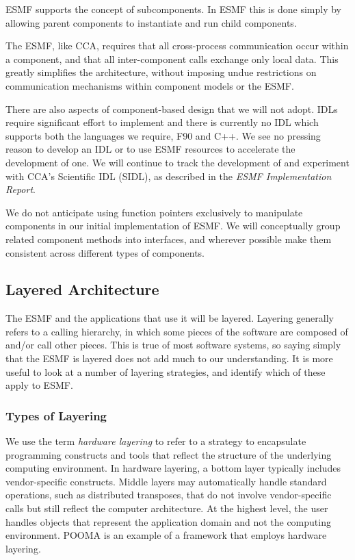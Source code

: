 ESMF supports the concept of subcomponents.  In ESMF this is done simply
by allowing parent components to instantiate and run child components.

The ESMF, like CCA, requires that all cross-process communication occur
within a component, and that all inter-component calls exchange only
local data.  This greatly simplifies the architecture, without 
imposing undue restrictions on communication mechanisms within component
models or the ESMF.

There are also aspects of component-based design that we will not adopt.
IDLs require significant effort to implement and there is currently no
IDL which supports both the languages we require, F90 and C++.  We see 
no pressing
reason to develop an IDL or to use ESMF resources to accelerate the development
of one.  We will continue to track the 
development of and experiment with CCA's Scientific IDL (SIDL), 
as described in the {\it ESMF Implementation Report}.

We do not anticipate using function pointers exclusively to manipulate
components in our initial implementation of ESMF.  We will conceptually
group related component methods into interfaces, and wherever possible 
make them consistent across different types of components.

\subsection{Layered Architecture}

The ESMF and the applications that use it will be layered.  Layering generally 
refers to a calling hierarchy, in which some pieces of the software are composed 
of and/or call other pieces.  This is true of most software systems, so 
saying simply that the ESMF is layered does not add much to our understanding.  
It is more useful to look at a number of layering strategies, 
and identify which of these apply to ESMF.

\subsubsection{Types of Layering}

We use the term {\it hardware layering} to refer to a strategy to encapsulate 
programming constructs and tools that reflect the structure of the underlying 
computing environment.  In hardware layering, a bottom layer typically includes 
vendor-specific constructs.  Middle layers may automatically 
handle standard operations, such as distributed transposes, that do not involve  
vendor-specific calls but still reflect the computer architecture.  At the highest
level, the user handles objects that represent the application 
domain and not the computing environment.  POOMA is an example of a framework
that employs hardware layering.  

